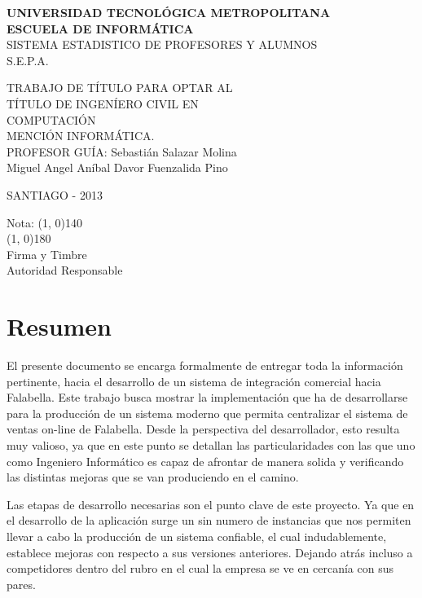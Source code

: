\documentclass[a4paper,12pt,openany,oneside]{book}
\begin{document}
\thispagestyle{empty}
\begin{center}
\textbf{UNIVERSIDAD TECNOLÓGICA METROPOLITANA\\
ESCUELA DE INFORMÁTICA}\\
\vspace{3cm}
SISTEMA ESTADISTICO DE PROFESORES Y ALUMNOS\\S.E.P.A.
\end{center}
\begin{flushright}
TRABAJO DE TÍTULO PARA OPTAR AL\\
TÍTULO DE INGENÍERO CIVIL EN\\
COMPUTACIÓN\\
MENCIÓN INFORMÁTICA.\\
\vspace{3cm}
PROFESOR GUÍA: Sebastián Salazar Molina\\
\vspace{1.5cm}
Miguel Angel Aníbal Davor Fuenzalida Pino
\end{flushright}
\vspace{4cm}
\begin{center}
SANTIAGO - 2013
\end{center}
\newpage
\thispagestyle{empty}
\begin{flushright}
\vspace{20mm}
Nota: \line(1, 0){140} \\
\vspace{30 mm}
\line(1, 0){180}\\	
Firma y Timbre\\
Autoridad Responsable
\end{flushright}
\chapter*{Resumen}
\thispagestyle{empty}
El presente documento se encarga formalmente de entregar toda la información pertinente, hacia el desarrollo de un sistema de integración comercial hacia Falabella. Este trabajo busca mostrar la implementación que ha de desarrollarse para la producción de un sistema moderno que permita centralizar el sistema de ventas on-line de Falabella. Desde la perspectiva del desarrollador, esto resulta  muy valioso, ya que en este punto se detallan las particularidades con las que uno como Ingeniero Informático es capaz de afrontar de manera solida y verificando las distintas mejoras que se van produciendo en el camino.

Las etapas de desarrollo necesarias son el punto clave de este proyecto. Ya que en el desarrollo de la aplicación surge un sin numero de instancias que nos permiten llevar a cabo la producción de un sistema confiable, el cual indudablemente, establece mejoras con respecto a sus versiones anteriores. Dejando atrás incluso a competidores dentro del rubro en el cual la empresa se ve en cercanía con sus pares.
\tableofcontents
\listoffigures
\end{document}
